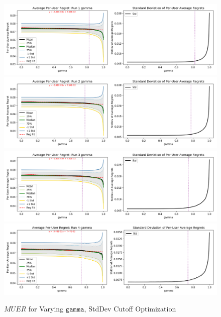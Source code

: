 	\begin{figure}[H]
	\includegraphics[width=1.1\textwidth,center]{figures/opt_param/opt_param_std_11100_gamma1.png}%
	\newline
	\includegraphics[width=1.1\textwidth,center]{figures/opt_param/opt_param_std_11100_gamma2.png}%
	\newline
	\includegraphics[width=1.1\textwidth,center]{figures/opt_param/opt_param_std_11100_gamma3.png}%
	\newline
	\includegraphics[width=1.1\textwidth,center]{figures/opt_param/opt_param_std_11100_gamma4.png}%
	\caption{$MUER$ for Varying $\mathtt{gamma}$, StdDev Cutoff Optimization}
	\end{figure}

